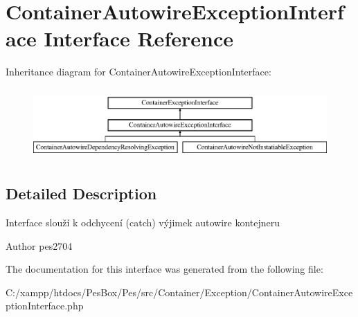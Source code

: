 \hypertarget{interface_pes_1_1_container_1_1_exception_1_1_container_autowire_exception_interface}{}\section{Container\+Autowire\+Exception\+Interface Interface Reference}
\label{interface_pes_1_1_container_1_1_exception_1_1_container_autowire_exception_interface}
Inheritance diagram for Container\+Autowire\+Exception\+Interface\+:\begin{figure}[H]
\begin{center}
\leavevmode
\includegraphics[height=2.736156cm]{interface_pes_1_1_container_1_1_exception_1_1_container_autowire_exception_interface}
\end{center}
\end{figure}


\subsection{Detailed Description}
Interface slouží k odchycení (catch) výjimek autowire kontejneru \begin{DoxyAuthor}{Author}
pes2704 
\end{DoxyAuthor}


The documentation for this interface was generated from the following file\+:\begin{DoxyCompactItemize}
\item 
C\+:/xampp/htdocs/\+Pes\+Box/\+Pes/src/\+Container/\+Exception/Container\+Autowire\+Exception\+Interface.\+php\end{DoxyCompactItemize}
